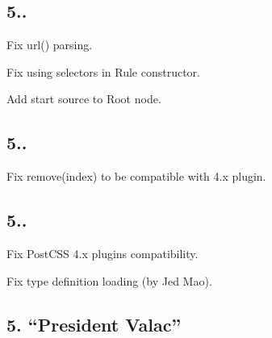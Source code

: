 \subsection*{5..}


\begin{DoxyItemize}
\item Fix {\ttfamily url()} parsing.
\item Fix using {\ttfamily selectors} in {\ttfamily Rule} constructor.
\item Add start source to {\ttfamily Root} node.
\end{DoxyItemize}

\subsection*{5..}


\begin{DoxyItemize}
\item Fix {\ttfamily remove(index)} to be compatible with 4.\+x plugin.
\end{DoxyItemize}

\subsection*{5..}


\begin{DoxyItemize}
\item Fix Post\+C\+SS 4.\+x plugins compatibility.
\item Fix type definition loading (by Jed Mao).
\end{DoxyItemize}

\subsection*{5. “\+President Valac”}


